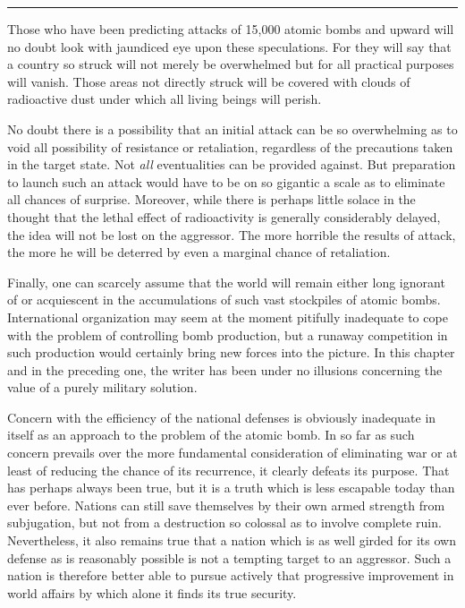 \noindent\hfil\rule{0.4\textwidth}{.4pt}\hfil

\vspace{4pt}

Those who have been predicting attacks of 15,000 atomic bombs and upward will no doubt look with jaundiced eye upon these speculations. For they will say that a country so struck will not merely be overwhelmed but for all practical purposes will vanish. Those areas not directly struck will be covered with clouds of radioactive dust under which all living beings will perish.

No doubt there is a possibility that an initial attack can be so overwhelming as to void all possibility of resistance or retaliation, regardless of the precautions taken in the target state. Not \emph{all} eventualities can be provided against. But preparation to launch such an attack would have to be on so gigantic a scale as to eliminate all chances of surprise. Moreover, while there is perhaps little solace in the thought that the lethal effect of radioactivity is generally considerably delayed, the idea will not be lost on the aggressor. The more horrible the results of attack, the more he will be deterred by even a marginal chance of retaliation.

Finally, one can scarcely assume that the world will remain either long ignorant of or acquiescent in the accumulations of such vast stockpiles of atomic bombs. International organization may seem at the moment pitifully inadequate to cope with the problem of controlling bomb production, but a runaway competition in such production would certainly bring new forces into the picture. In this chapter and in the preceding one, the writer has been under no illusions concerning the value of a purely military solution.

Concern with the efficiency of the national defenses is obviously inadequate in itself as an approach to the problem of the atomic bomb. In so far as such concern prevails over the more fundamental consideration of eliminating war or at least of reducing the chance of its recurrence, it clearly defeats its purpose. That has perhaps always been true, but it is a truth which is less escapable today than ever before. Nations can still save themselves by their own armed strength from subjugation, but not from a destruction so colossal as to involve complete ruin. Nevertheless, it also remains true that a nation which is as well girded for its own defense as is reasonably possible is not a tempting target to an aggressor. Such a nation is therefore better able to pursue actively that progressive improvement in world affairs by which alone it finds its true security.
